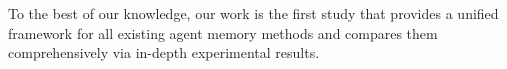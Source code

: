 To the best of our knowledge, our work is the first study that
provides a unified framework for all existing agent memory methods and compares them comprehensively via in-depth experimental results.









